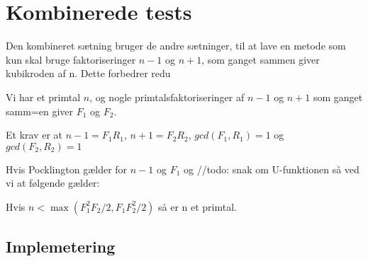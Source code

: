 \section{Kombinerede tests}
Den kombineret sætning bruger de andre sætninger, til at lave en
metode som kun skal bruge faktoriseringer $n-1$ og $n+1$, som ganget
sammen giver kubikroden af n. Dette forbedrer redu

Vi har et primtal $n$, og nogle primtalsfaktoriseringer af $n-1$ og $n+1$
som ganget samm=en giver $F_1$ og $F_2$.

Et krav er at $n-1=F_1R_1$, $n+1=F_2R_2$, $gcd(F_1,R_1)=1$ og $gcd(F_2,R_2)=1$

Hvis Pocklington gælder for $n-1$ og $F_1$ og //todo: snak om U-funktionen
så ved vi at følgende gælder:

Hvis $n<\max(F_1^2F_2/2,F_1F_2^2/2)$ så er n et primtal.


\subsection{Implemetering}







